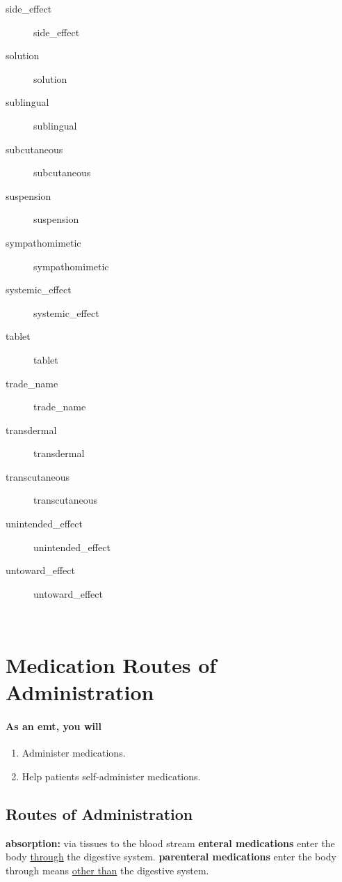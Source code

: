 \documentclass[../../EMT-169.tex]{subfiles}
\begin{document}
\begin{description}
	\item [\gls{side_effect}] 				\glsdesc{side_effect}
	\item [\gls{solution}] 					\glsdesc{solution}
	\item [\gls{sublingual}] 				\glsdesc{sublingual}
	\item [\gls{subcutaneous}] 				\glsdesc{subcutaneous}
	\item [\gls{suspension}] 				\glsdesc{suspension}
	\item [\gls{sympathomimetic}]			\glsdesc{sympathomimetic}
	\item [\gls{systemic_effect}] 			\glsdesc{systemic_effect}
	\item [\gls{tablet}] 					\glsdesc{tablet}
	\item [\gls{trade_name}] 				\glsdesc{trade_name}
	\item [\gls{transdermal}] 				\glsdesc{transdermal}
	\item [\gls{transcutaneous}] 			\glsdesc{transcutaneous}
	\item [\gls{unintended_effect}] 		\glsdesc{unintended_effect}
	\item [\gls{untoward_effect}] 			\glsdesc{untoward_effect}
\end{description}\hfill \\
\clearpage

\section{Medication Routes of Administration}
\paragraph{As an \acrshort{emt}, you will}
\begin{enumerate}
	\item Administer medications.
	\item Help patients self-administer medications.
\end{enumerate}

\subsection{Routes of Administration}
\begin{outline}	
	\1[] \textbf{absorption:} via tissues to the blood stream
	\2[] \textbf{enteral medications} enter the body \underline{through} the digestive system.
	\2[] \textbf{parenteral medications} enter the body through means \underline{other than} the digestive system.
\end{outline}		
\end{document}

